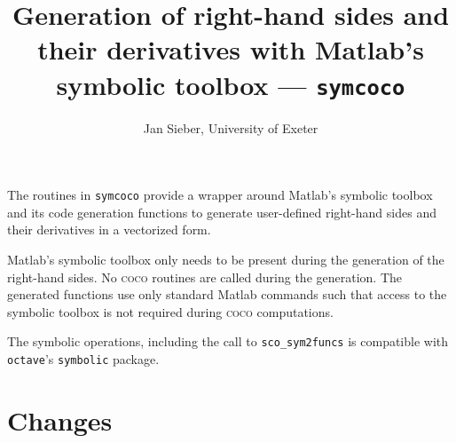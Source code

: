 \documentclass[11pt]{scrartcl}
\newcommand{\blist}[1]{\mbox{\lstinline!#1!}}
\begin{document}
\title{Generation of right-hand sides and their
  derivatives with Matlab's symbolic toolbox --- \texttt{symcoco}}

\author{Jan Sieber, University of Exeter}
\date{}
\maketitle
\tableofcontents
The routines in \blist{symcoco} provide a wrapper around Matlab's
symbolic toolbox and its code generation functions to
generate user-defined right-hand sides and their derivatives in a vectorized form.

Matlab's symbolic toolbox only needs to be present during the
generation of the right-hand sides. No \textsc{coco} routines are
called during the generation. The generated functions use only
standard Matlab commands such that access to the symbolic toolbox is
not required during \textsc{coco} computations.

The symbolic operations, including the call to \blist{sco_sym2funcs}
is compatible with \texttt{octave}'s \texttt{symbolic} package.
\section{Changes}
\label{sec:changes}
\end{document}
